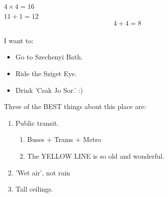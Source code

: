 \documentclass{article}
\begin{document}
$4 \times 4 = 16$\\
$11 + 1 = 12$\\

$$4 + 4 = 8$$\\


I want to:
\begin{itemize}
\item Go to Szechenyi Bath.
\item Ride the Sziget Eye.
\item Drink 'Csak Jo Sor.' :)
\end{itemize}

Three of the BEST things about this place are:
\begin{enumerate}
\item Public transit.
\begin{enumerate}
\item Buses + Trams + Metro
\item The YELLOW LINE is so old and wonderful.
\end{enumerate}
\item 'Wet air', not rain
\item Tall ceilings.
\end{enumerate}

\end{document}
